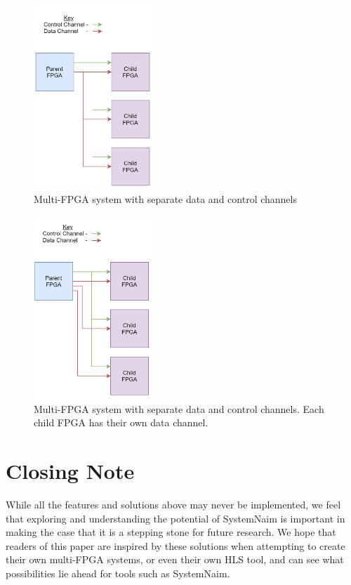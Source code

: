 \begin{figure}[!h]
    \centering
    \includegraphics[width=0.4\textwidth]{06_future_work/images/data_control_channels.png}
    \caption{Multi-FPGA system with separate data and control channels}
    \label{fig:data_control}
\end{figure}

\begin{figure}[!h]
    \centering
    \includegraphics[width=0.4\textwidth]{06_future_work/images/data_control_channels_independent.png}
    \caption{Multi-FPGA system with separate data and control channels. Each child FPGA has their own data channel.}
    \label{fig:data_control_ind}
\end{figure}

\section{Closing Note}

While all the features and solutions above may never be implemented, we feel that exploring and understanding the potential of SystemNaim is important in making the case that it is a stepping stone for future research. We hope that readers of this paper are inspired by these solutions when attempting to create their own multi-FPGA systems, or even their own HLS tool, and can see what possibilities lie ahead for tools such as SystemNaim.